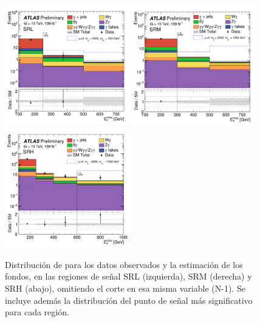 \begin{figure}[!ht]
   \centering
   \includegraphics[width=0.48\textwidth]{images/results/fr2_unblind/sigReg_SRL_fr2_met_et_v2.pdf}
   \includegraphics[width=0.48\textwidth]{images/results/fr2_unblind/sigReg_SRM_fr2_met_et_v2.pdf}
   \includegraphics[width=0.48\textwidth]{images/results/fr2_unblind/sigReg_SRH_fr2_met_et_v2.pdf}
   \caption{Distribución de \met para los datos observados y la estimación de los fondos, en las regiones de señal SRL (izquierda), SRM (derecha) y SRH (abajo), omitiendo el corte en esa misma variable (N-1). Se incluye además la distribución del punto de señal más significativo para cada región.}
   \label{fig:met_n-1_SRL_SRM_SRH_fr2}
\end{figure}


